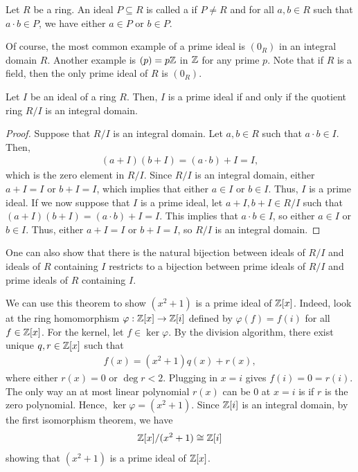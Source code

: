 \begin{definition}
    Let $R$ be a ring. An ideal $P \subseteq R$ is called a  if $P \neq R$ and for all $a, b \in R$ such that $a \cdot b \in P$, we have either $a \in P$ or $b \in P$.
\end{definition}

Of course, the most common example of a prime ideal is $(0_{R})$ in an integral domain $R$. Another example is $(p) = p\mathbb{Z}$ in $\mathbb{Z}$ for any prime $p$. Note that if $R$ is a field, then the only prime ideal of $R$ is $(0_{R})$.

\begin{theorem}
    Let $I$ be an ideal of a ring $R$. Then, $I$ is a prime ideal if and only if the quotient ring $R/I$ is an integral domain.
\end{theorem}
\begin{proof}
    Suppose that $R/I$ is an integral domain. Let $a, b \in R$ such that $a \cdot b \in I$. Then,
    \begin{align}
        (a + I)(b + I) = (a \cdot b) + I = I,
    \end{align}
    which is the zero element in $R/I$. Since $R/I$ is an integral domain, either $a + I = I$ or $b + I = I$, which implies that either $a \in I$ or $b \in I$. Thus, $I$ is a prime ideal. If we now suppose that $I$ is a prime ideal, let $a + I, b + I \in R/I$ such that $(a+I)(b+I) = (a \cdot b) + I = I$. This implies that $a \cdot b \in I$, so either $a \in I$ or $b \in I$. Thus, either $a + I = I$ or $b + I = I$, so $R/I$ is an integral domain.
\end{proof}

One can also show that there is the natural bijection between ideals of $R/I$ and ideals of $R$ containing $I$ restricts to a bijection between prime ideals of $R/I$ and prime ideals of $R$ containing $I$.

\begin{example}
    We can use this theorem to show $(x^{2}+1)$ is a prime ideal of $\mathbb{Z}[x]$. Indeed, look at the ring homomorphism $\varphi : \mathbb{Z}[x] \to \mathbb{Z}[i]$ defined by $\varphi(f) = f(i)$ for all $f \in \mathbb{Z}[x]$. For the kernel, let $f \in \ker \varphi$. By the division algorithm, there exist unique $q, r \in \mathbb{Z}[x]$ such that
    \begin{align}
        f(x) = (x^{2}+1)q(x) + r(x),
    \end{align}
    where either $r(x) = 0$ or $\deg r < 2$. Plugging in $x = i$ gives $f(i) = 0 = r(i)$. The only way an at most linear polynomial $r(x)$ can be 0 at $x = i$ is if $r$ is the zero polynomial. Hence, $\ker \varphi = (x^{2}+1)$. Since $\mathbb{Z}[i]$ is an integral domain, by the first isomorphism theorem, we have
    \begin{align}
        \mathbb{Z}[x]/(x^{2}+1) \cong \mathbb{Z}[i]
    \end{align}
    showing that $(x^{2}+1)$ is a prime ideal of $\mathbb{Z}[x]$.
\end{example}


